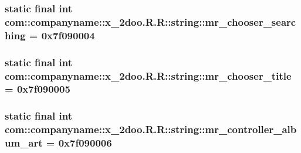\hypertarget{classcom_1_1companyname_1_1x__2doo_1_1_r_1_1string_73399a363ecb63356522de55489e41e4}{
\subsubsection[{mr\_\-chooser\_\-searching}]{\setlength{\rightskip}{0pt plus 5cm}static final int com::companyname::x\_\-2doo.R.R::string::mr\_\-chooser\_\-searching = 0x7f090004}}
\label{classcom_1_1companyname_1_1x__2doo_1_1_r_1_1string_73399a363ecb63356522de55489e41e4}


\hypertarget{classcom_1_1companyname_1_1x__2doo_1_1_r_1_1string_ebf29b568884f0255f52dae0ffaaf34b}{
\subsubsection[{mr\_\-chooser\_\-title}]{\setlength{\rightskip}{0pt plus 5cm}static final int com::companyname::x\_\-2doo.R.R::string::mr\_\-chooser\_\-title = 0x7f090005}}
\label{classcom_1_1companyname_1_1x__2doo_1_1_r_1_1string_ebf29b568884f0255f52dae0ffaaf34b}


\hypertarget{classcom_1_1companyname_1_1x__2doo_1_1_r_1_1string_c827c281bd217b5c8f78795cf1efb016}{
\subsubsection[{mr\_\-controller\_\-album\_\-art}]{\setlength{\rightskip}{0pt plus 5cm}static final int com::companyname::x\_\-2doo.R.R::string::mr\_\-controller\_\-album\_\-art = 0x7f090006}}
\label{classcom_1_1companyname_1_1x__2doo_1_1_r_1_1string_c827c281bd217b5c8f78795cf1efb016}


